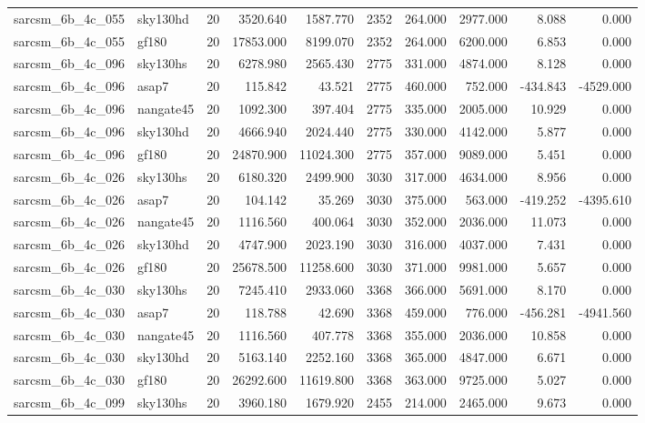 \documentclass{article}
\begin{document}
\begin{longtable}{llrrrrrrrr}
sarcsm\_6b\_4c\_055 & sky130hd & 20 & 3520.640 & 1587.770 & 2352 & 264.000 & 2977.000 & 8.088 & 0.000 \\
sarcsm\_6b\_4c\_055 & gf180 & 20 & 17853.000 & 8199.070 & 2352 & 264.000 & 6200.000 & 6.853 & 0.000 \\
sarcsm\_6b\_4c\_096 & sky130hs & 20 & 6278.980 & 2565.430 & 2775 & 331.000 & 4874.000 & 8.128 & 0.000 \\
sarcsm\_6b\_4c\_096 & asap7 & 20 & 115.842 & 43.521 & 2775 & 460.000 & 752.000 & -434.843 & -4529.000 \\
sarcsm\_6b\_4c\_096 & nangate45 & 20 & 1092.300 & 397.404 & 2775 & 335.000 & 2005.000 & 10.929 & 0.000 \\
sarcsm\_6b\_4c\_096 & sky130hd & 20 & 4666.940 & 2024.440 & 2775 & 330.000 & 4142.000 & 5.877 & 0.000 \\
sarcsm\_6b\_4c\_096 & gf180 & 20 & 24870.900 & 11024.300 & 2775 & 357.000 & 9089.000 & 5.451 & 0.000 \\
sarcsm\_6b\_4c\_026 & sky130hs & 20 & 6180.320 & 2499.900 & 3030 & 317.000 & 4634.000 & 8.956 & 0.000 \\
sarcsm\_6b\_4c\_026 & asap7 & 20 & 104.142 & 35.269 & 3030 & 375.000 & 563.000 & -419.252 & -4395.610 \\
sarcsm\_6b\_4c\_026 & nangate45 & 20 & 1116.560 & 400.064 & 3030 & 352.000 & 2036.000 & 11.073 & 0.000 \\
sarcsm\_6b\_4c\_026 & sky130hd & 20 & 4747.900 & 2023.190 & 3030 & 316.000 & 4037.000 & 7.431 & 0.000 \\
sarcsm\_6b\_4c\_026 & gf180 & 20 & 25678.500 & 11258.600 & 3030 & 371.000 & 9981.000 & 5.657 & 0.000 \\
sarcsm\_6b\_4c\_030 & sky130hs & 20 & 7245.410 & 2933.060 & 3368 & 366.000 & 5691.000 & 8.170 & 0.000 \\
sarcsm\_6b\_4c\_030 & asap7 & 20 & 118.788 & 42.690 & 3368 & 459.000 & 776.000 & -456.281 & -4941.560 \\
sarcsm\_6b\_4c\_030 & nangate45 & 20 & 1116.560 & 407.778 & 3368 & 355.000 & 2036.000 & 10.858 & 0.000 \\
sarcsm\_6b\_4c\_030 & sky130hd & 20 & 5163.140 & 2252.160 & 3368 & 365.000 & 4847.000 & 6.671 & 0.000 \\
sarcsm\_6b\_4c\_030 & gf180 & 20 & 26292.600 & 11619.800 & 3368 & 363.000 & 9725.000 & 5.027 & 0.000 \\
sarcsm\_6b\_4c\_099 & sky130hs & 20 & 3960.180 & 1679.920 & 2455 & 214.000 & 2465.000 & 9.673 & 0.000 \\

\end{longtable}
\end{document}
